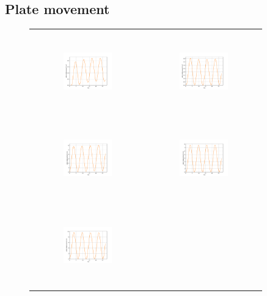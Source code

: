 \subsection{Plate movement}
\begin{figure}[H]
\begin{center}
\begin{tabular}{cc}
\includegraphics[width=0.45\textwidth, height=3.5cm]{graph/omega=0.50_A=1_plate.pdf}
&
\includegraphics[width=0.45\textwidth, height=3.5cm]{graph/omega=0.50_A=2_plate.pdf}\\
\includegraphics[width=0.45\textwidth, height=3.5cm]{graph/omega=0.50_A=3_plate.pdf}
&
\includegraphics[width=0.45\textwidth, height=3.5cm]{graph/omega=0.50_A=4_plate.pdf}\\
\includegraphics[width=0.45\textwidth, height=3.5cm]{graph/omega=0.50_A=5_plate.pdf}

\end{tabular}
\end{center}
\end{figure}
